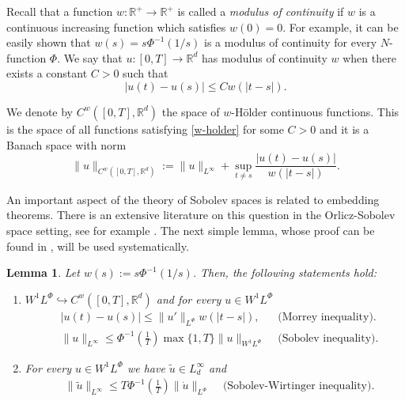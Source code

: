 \documentclass[twoside]{article}
\newtheorem{lem}[thm]{Lemma}
\theoremstyle{remark}
\newcommand{\orlnor}{\|_{L^{\Phi}}}
\newcommand{\lphi}{L^{\Phi}}
\newcommand{\wphi}{W^{1}\lphi}
\newcommand{\sobnor}{\|_{W^{1}\lphi}}
\newcommand{\rr}{\mathbb{R}}
\renewcommand{\leq}{\leqslant}
\begin{document}
 Recall that a function   $w:\mathbb{R}^+\to \mathbb{R}^+$ is called  a \emph{modulus of continuity} if $w$ is a continuous increasing function which satisfies $w(0)=0$. For example, it can be easily shown that $w(s)=s\Phi^{-1}(1/s)$ is a modulus of  continuity for every $N$-function $\Phi$.  We say that $u:[0,T]\to\rr^d$  has modulus of continuity $w$  when there exists a constant $C>0$ such that
\begin{equation}\label{w-holder}|u(t)-u(s)|\leq Cw(|t-s|).
\end{equation}


We denote by $C^w([0,T],\rr^d)$  the space of  $w$-H\"older continuous functions. This is the space of all functions satisfying \eqref{w-holder} for some $C>0$ and it is a Banach space with norm
\[\|u\|_{  C^w([0,T],\rr^d) }  :=\|u\|_{L^{\infty}}+\sup\limits_{t\neq s}\frac{|u(t)-u(s)|}{w(|t-s|)}.\]





 An important aspect of the theory of Sobolev spaces is related to embedding theorems. There is an extensive literature on this question in the  Orlicz-Sobolev space setting, see for example
 \cite{cianchi2000fully,cianchi1999some,claverooptimal,edmunds2000optimal,kerman2006optimal}.
The next simple lemma, whose proof can be found in \cite{ABGMS2015}, will be used systematically.




\begin{lem}\label{inclusion orlicz} Let  $w(s):= s\Phi^{-1}(1/s)$. Then, the following statements hold:
\begin{enumerate}
\item\label{inclusion orlicz_item1} $\wphi\hookrightarrow C^w([0,T],\rr^d) $ and for every $u\in\wphi$
\begin{align}
 &\left|u(t)-u(s) \right| \leq  \|u'\orlnor w(| t-s|),&\text{  (Morrey inequality).}\label{in-sob-cont}
\\
& \|u\|_{L^{\infty}} \leq\Phi^{-1}\left(\frac{1}{T}\right)\max\{1,T\}\|u\sobnor&\text{  (Sobolev inequality).}\label{sobolev}
\end{align}
\item For every $u\in\wphi$ we have $\widetilde{u}\in L^{\infty}_d$ and
\begin{align}
& \|\widetilde{u}\|_{L^{\infty}} \leq T\Phi^{-1}\left(\frac{1}{T}\right)\|\dot{u}\orlnor&\text{  (Sobolev-Wirtinger inequality).}\label{wirtinger}
\end{align}




\end{enumerate}
\end{lem}
\end{document}
